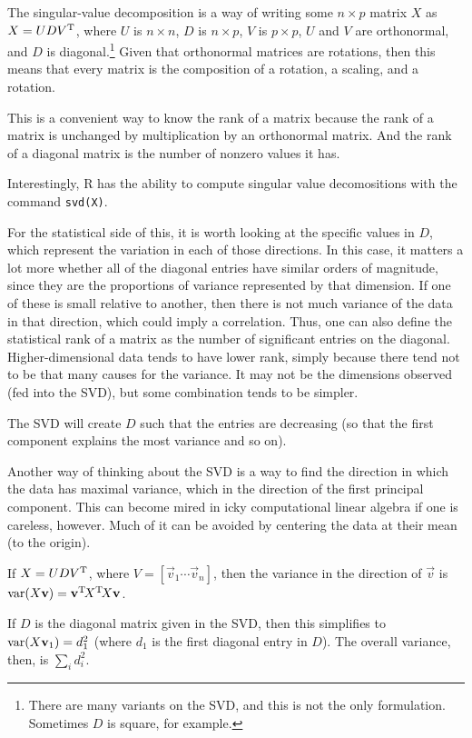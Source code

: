 The singular-value decomposition is a way of writing some $n\times p$ matrix $X$ as $X = UDV^{\mathrm{T}}$, where $U$ is $n\times n$, $D$ is $n\times p$, $V$ is $p\times p$, $U$ and $V$ are orthonormal, and $D$ is diagonal.\footnote{There are many variants on the SVD, and this is not the only formulation. Sometimes $D$ is square, for example.} Given that orthonormal matrices are rotations, then this means that every matrix is the composition of a rotation, a scaling, and a rotation.

This is a convenient way to know the rank of a matrix because the rank of a matrix is unchanged by multiplication by an orthonormal matrix. And the rank of a diagonal matrix is the number of nonzero values it has.

Interestingly, R has the ability to compute singular value decomositions with the command \texttt{svd(X)}.

For the statistical side of this, it is worth looking at the specific values in $D$, which represent the variation in each of those directions. In this case, it matters a lot more whether all of the diagonal entries have similar orders of magnitude, since they are the proportions of variance represented by that dimension. If one of these is small relative to another, then there is not much variance of the data in that direction, which could imply a correlation. Thus, one can also define the statistical rank of a matrix as the number of significant entries on the diagonal. Higher-dimensional data tends to have lower rank, simply because there tend not to be that many causes for the variance. It may not be the dimensions observed (fed into the SVD), but some combination tends to be simpler.

The SVD will create $D$ such that the entries are decreasing (so that the first component explains the most variance and so on).

Another way of thinking about the SVD is a way to find the direction in which the data has maximal variance, which in the direction of the first principal component. This can become mired in icky computational linear algebra if one is careless, however. Much of it can be avoided by centering the data at their mean (to the origin).
\begin{defn}
If $X = UDV^{\mathrm{T}}$, where $V = [\vec v_1 \dotsb \vec v_n]$, then the variance in the direction of $\vec v$ is $\operatorname{var}(X\mathbf v) = \mathbf v^{\mathrm{T}}\! X^{\mathrm{T}}\! X\mathbf v$.
\end{defn}
If $D$ is the diagonal matrix given in the SVD, then this simplifies to $\operatorname{var} (X\mathbf v_1) = d_1^2$ (where $d_1$ is the first diagonal entry in $D$). The overall variance, then, is $\sum_i d_i^2$.

